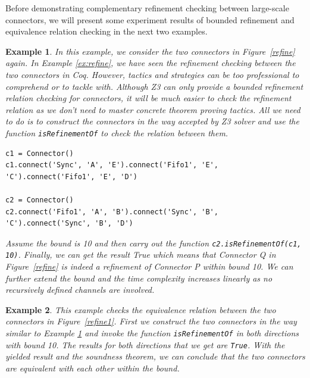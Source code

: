\documentclass[preprint,3p]{elsarticle}
\newtheorem{example}{Example}[section]
\begin{document}
Before demonstrating complementary refinement checking between large-scale connectors, we will present some experiment results of bounded refinement and equivalence relation checking in the next two examples.
\begin{example}
\label{ex:equivalence1}
In this example, we consider the two connectors in Figure~\ref{refine} again. In  Example \ref{ex:refine}, we have seen the refinement checking between the two connectors in Coq. However, tactics and strategies can be too professional to comprehend or to tackle with. Although Z3 can only provide a bounded refinement relation checking for connectors, it will be much easier to check the refinement relation as we don't need to master concrete theorem proving tactics. All we need to do is to construct the connectors in the way accepted by Z3 solver and use the function \texttt{isRefinementOf} to check the relation between them.
\begin{lstlisting}
c1 = Connector()
c1.connect('Sync', 'A', 'E').connect('Fifo1', 'E', 'C').connect('Fifo1', 'E', 'D')

c2 = Connector()
c2.connect('Fifo1', 'A', 'B').connect('Sync', 'B', 'C').connect('Sync', 'B', 'D')
\end{lstlisting}
Assume the bound is 10 and then carry out the function \texttt{c2.isRefinementOf(c1, 10)}. Finally, we can get the result \emph{True} which means that \emph{Connector Q} in Figure~\ref{refine} is indeed a refinement of \emph{Connector P} within bound 10. We can further extend the bound and the time complexity increases linearly as no recursively defined channels are involved.
\end{example}

\begin{example}
This example checks the equivalence relation between the two connectors in Figure~\ref{refine1}. First we construct the two connectors in the way similar to Example \ref{ex:equivalence1} and invoke the function \texttt{isRefinementOf} in both directions with bound 10. The results for both directions that we get are \texttt{True}. With the yielded result and the soundness theorem, we can conclude that the two connectors are equivalent with each other within the bound.
\end{example}
\end{document}
